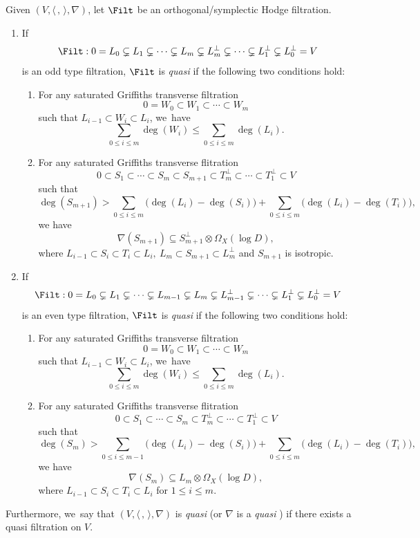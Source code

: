 \skpt
\begin{defn}\label{defn_gr_semi_even}
Given $(V,\langle \,, \, \rangle,\nabla)$, let $\Filt$ be an orthogonal/symplectic Hodge filtration. 
\begin{enumerate}
\item If
\[
\Filt: 0= L_0 \subsetneq L_1 \subsetneq \cdots \subsetneq L_m \subsetneq L_m^\perp\subsetneq\cdots \subsetneq L_1^\perp\subsetneq L_0^\perp= V
\]
is an odd type filtration, $\Filt$ is \emph{quasi \grsemistable} if the following two conditions hold: 
\begin{enumerate}\renewcommand{\theenumii}{\Roman{enumii}}
\item\label{cond2:I}
For any saturated Griffiths transverse filtration
\[
0=W_0\subset W_1 \subset \cdots\subset W_m
\]
such that $L_{i-1}\subset W_i\subset L_i$, we~have
\[
\sum_{0\leq i\leq m}\deg(W_i)\leqslant\sum_{0\leq i\leq m}\deg(L_i).
\]

\item\label{cond2:II}
For any saturated Griffiths transverse flitration
\[
0\subset S_1 \subset \cdots\subset S_m\subset S_{m+1}\subset T_m^\perp\subset\cdots \subset T_1^\perp\subset V
\]
such that
\[
\deg(S_{m+1})>\sum_{0\leq i\leq m}\big(\deg(L_i)-\deg(S_i)\big)+\sum_{0\leq i\leq m}\big(\deg(L_i)-\deg(T_i)\big),
\]
we have
\[
\nabla(S_{m+1})\subseteq S_{m+1}^\perp \otimes\Omega_X(\log D),
\]
where $L_{i-1}\subset S_i \subset T_i \subset L_i,\ L_m\subset S_{m+1}\subset L_m^\perp$ and $S_{m+1}$
is isotropic.
\end{enumerate}

\item If
\[
\Filt: 0= L_0 \subsetneq L_1 \subsetneq \cdots\subsetneq L_{m-1} \subsetneq L_m \subsetneq L_{m-1}^\perp\subsetneq\cdots \subsetneq L_1^\perp\subsetneq L_0^\perp= V
\]
is an even type filtration, $\Filt$ is \emph{quasi \grsemistable} if the following two conditions hold:
\begin{enumerate}\renewcommand{\theenumi}{\Roman{enumi}}
\item\label{enum:I}
For any saturated Griffiths transverse filtration
\[
0=W_0\subset W_1 \subset \cdots\subset W_m
\]
such that $L_{i-1}\subset W_i\subset L_i$, we~have
\[
\sum_{0\leq i\leq m}\deg(W_i)\leqslant\sum_{0\leq i\leq m}\deg(L_i).
\]

\item\label{enum:II}
For any saturated Griffiths transverse flitration
\[
0\subset S_1 \subset \cdots\subset S_m\subset T_m^\perp\subset\cdots \subset T_1^\perp\subset V
\]
such that
\[
\deg(S_m)>\sum_{0\leq i\leq m-1}\big(\deg(L_i)-\deg(S_i)\big)+\sum_{0\leq i\leq m}\big(\deg(L_i)-\deg(T_i)\big),
\]
we have
\[
\nabla(S_m)\subseteq L_m \otimes\Omega_X(\log D),
\]
where $L_{i-1}\subset S_i \subset T_i \subset L_i$ for $1\leq i\leq m$.
\end{enumerate}
\end{enumerate}
Furthermore, we~say that $(V,\langle \,, \, \rangle,\nabla)$ is \emph{quasi \grsemistable} (or $\nabla$ is a \emph{quasi \grsemistable \lconnection}) if there exists a quasi \grsemistable filtration on $V$.
\end{defn}

